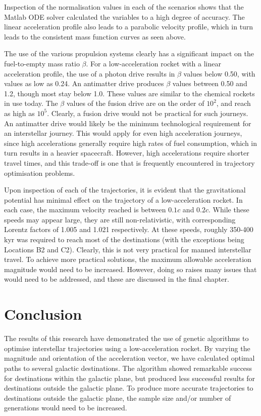 \documentclass[review]{elsarticle}
\begin{document}
Inspection of the normalisation values in each of the scenarios shows that the Matlab ODE solver calculated the variables to a high degree of accuracy. The linear acceleration profile also leads to a parabolic velocity profile, which in turn leads to the consistent mass function curves as seen above.

The use of the various propulsion systems clearly has a significant impact on the fuel-to-empty mass ratio $\beta$. For a low-acceleration rocket with a linear acceleration profile, the use of a photon drive results in $\beta$ values below 0.50, with values as low as 0.24. An antimatter drive produces $\beta$ values between 0.50 and 1.2, though most stay below 1.0. These values are similar to the chemical rockets in use today. The $\beta$ values of the fusion drive are on the order of $10^2$, and reach as high as $10^5$. Clearly, a fusion drive would not be practical for such journeys. An antimatter drive would likely be the minimum technological requirement for an interstellar journey. This would apply for even high acceleration journeys, since high accelerations generally require high rates of fuel consumption, which in turn results in a heavier spacecraft. However, high accelerations require shorter travel times, and this trade-off is one that is frequently encountered in trajectory optimisation problems.

Upon inspection of each of the trajectories, it is evident that the gravitational potential has minimal effect on the trajectory of a low-acceleration rocket.
In each case, the maximum velocity reached is between $0.1c$ and $0.2c$. While these speeds may appear large, they are still non-relativistic, with corresponding Lorentz factors of 1.005 and 1.021 respectively. At these speeds, roughly 350-400\,kyr was required to reach most of the destinations (with the exceptions being Locations B2 and C2). Clearly, this is not very practical for manned interstellar travel. To achieve more practical solutions, the maximum allowable acceleration magnitude would need to be increased. However, doing so raises many issues that would need to be addressed, and these are discussed in the final chapter.

\section{Conclusion}
The results of this research have demonstrated the use of genetic algorithms to optimise interstellar trajectories using a low-acceleration rocket. By varying the magnitude and orientation of the acceleration vector, we have calculated optimal paths to several galactic destinations. The algorithm showed remarkable success for destinations within the galactic plane, but produced less successful results for destinations outside the galactic plane. To produce more accurate trajectories to destinations outside the galactic plane, the sample size and/or number of generations would need to be increased.
\end{document}

